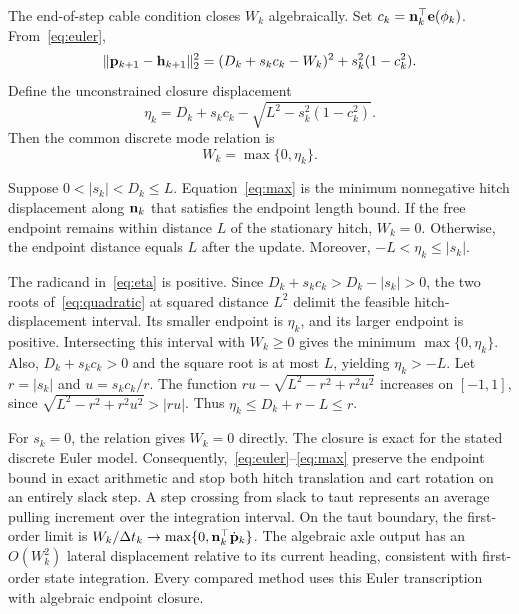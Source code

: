 The end-of-step cable condition closes $W_k$ algebraically. Set $c_k=\mathbf n_k^\top\mathbf e(\phi_k)$. From~\eqref{eq:euler},
\begin{equation}
\|\mathbf p_{k+1}-\mathbf h_{k+1}\|_2^2
=(D_k+s_kc_k-W_k)^2+s_k^2(1-c_k^2).
\label{eq:quadratic}
\end{equation}
Define the unconstrained closure displacement
\begin{equation}
\eta_k=D_k+s_kc_k-\sqrt{L^2-s_k^2(1-c_k^2)}.
\label{eq:eta}
\end{equation}
Then the common discrete mode relation is
\begin{equation}
W_k=\max\{0,\eta_k\}.
\label{eq:max}
\end{equation}

\begin{proposition}
Suppose $0<|s_k|<D_k\leq L$. Equation~\eqref{eq:max} is the minimum nonnegative hitch displacement along $\mathbf n_k$ that satisfies the endpoint length bound. If the free endpoint remains within distance $L$ of the stationary hitch, $W_k=0$. Otherwise, the endpoint distance equals $L$ after the update. Moreover, $-L<\eta_k\leq |s_k|$.
\label{prop:closure}
\end{proposition}
\begin{IEEEproof}
The radicand in~\eqref{eq:eta} is positive. Since $D_k+s_kc_k>D_k-|s_k|>0$, the two roots of~\eqref{eq:quadratic} at squared distance $L^2$ delimit the feasible hitch-displacement interval. Its smaller endpoint is $\eta_k$, and its larger endpoint is positive. Intersecting this interval with $W_k\geq0$ gives the minimum $\max\{0,\eta_k\}$. Also, $D_k+s_kc_k>0$ and the square root is at most $L$, yielding $\eta_k>-L$. Let $r=|s_k|$ and $u=s_kc_k/r$. The function $ru-\sqrt{L^2-r^2+r^2u^2}$ increases on $[-1,1]$, since $\sqrt{L^2-r^2+r^2u^2}>|ru|$. Thus $\eta_k\leq D_k+r-L\leq r$.
\end{IEEEproof}

For $s_k=0$, the relation gives $W_k=0$ directly. The closure is exact for the stated discrete Euler model. Consequently,~\eqref{eq:euler}--\eqref{eq:max} preserve the endpoint bound in exact arithmetic and stop both hitch translation and cart rotation on an entirely slack step. A step crossing from slack to taut represents an average pulling increment over the integration interval. On the taut boundary, the first-order limit is $W_k/\Delta t_k\to\max\{0,\mathbf n_k^\top\dot{\mathbf p}_k\}$. The algebraic axle output has an $O(W_k^2)$ lateral displacement relative to its current heading, consistent with first-order state integration. Every compared method uses this Euler transcription with algebraic endpoint closure.

